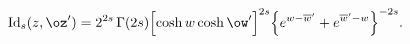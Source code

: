\begin{equation}
\mathrm{Id}_s(z,\oz')=2^{2s}\,\Gamma(2s)
\Bigl[\cosh w\cosh \ow'\Bigr]^{2s}
\Bigl\{e^{w-\overline{w}'}+
e^{\overline{w}'-w}\Bigr\}^{-2s}.
\end{equation}


